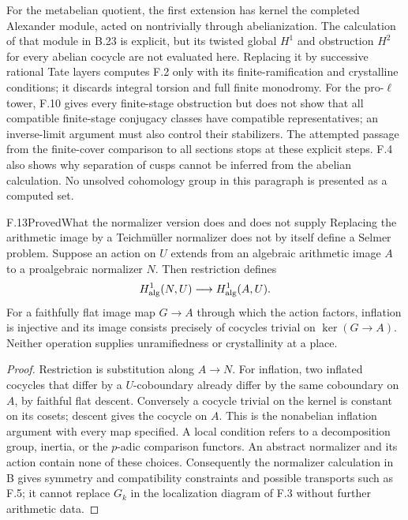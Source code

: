 For the metabelian quotient, the first extension has
kernel the completed Alexander module, acted on
nontrivially through abelianization. The calculation of
that module in B.23 is explicit, but its twisted global
$H^1$ and obstruction $H^2$ for every abelian cocycle
are not evaluated here. Replacing it by successive
rational Tate layers computes F.2 only with its
finite-ramification and crystalline conditions; it
discards integral torsion and full finite monodromy.
For the pro-$\ell$ tower, F.10 gives every finite-stage
obstruction but does not show that all compatible
finite-stage conjugacy classes have compatible
representatives; an inverse-limit argument must also
control their stabilizers. The attempted passage from
the finite-cover comparison to all sections stops at
these explicit steps. F.4 also shows why separation
of cusps cannot be inferred from the abelian calculation.
No unsolved cohomology group in this paragraph is
presented as a computed set.

\begin{statement}{F.13}{Proved}{What the normalizer version does and does not supply}
Replacing the arithmetic image by a Teichm\"uller
normalizer does not by itself define a Selmer problem.
Suppose an action on $U$ extends from an algebraic
arithmetic image $A$ to a proalgebraic normalizer $N$.
Then restriction defines
\[
 H^1_{\rm alg}(N,U)\longrightarrow H^1_{\rm alg}(A,U).
\]
For a faithfully flat image map $G\to A$ through which
the action factors, inflation is injective and its
image consists precisely of cocycles trivial on
$\ker(G\to A)$. Neither operation supplies
unramifiedness or crystallinity at a place.
\end{statement}
\begin{proof}
Restriction is substitution along $A\to N$.
For inflation, two inflated cocycles that differ by
a $U$-coboundary already differ by the same coboundary
on $A$, by faithful flat descent. Conversely a
cocycle trivial on the kernel is constant on its
cosets; descent gives the cocycle on $A$. This is
the nonabelian inflation argument with every map
specified. A local condition refers to a decomposition
group, inertia, or the $p$-adic comparison functors.
An abstract normalizer and its action contain none
of these choices. Consequently the normalizer
calculation in B gives symmetry and compatibility
constraints and possible transports such as F.5;
it cannot replace $G_k$ in the localization diagram
of F.3 without further arithmetic data.
\end{proof}

